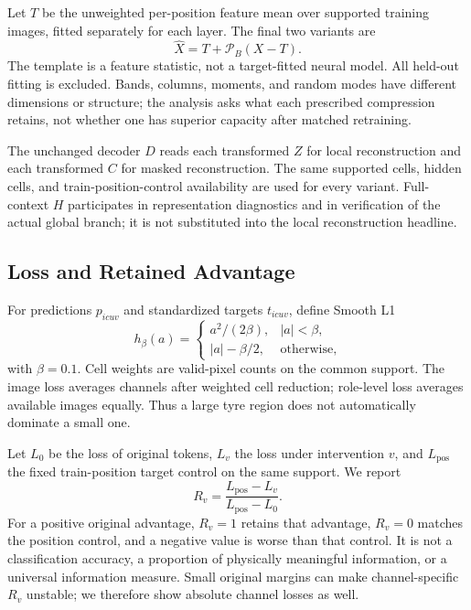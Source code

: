 Let $T$ be the unweighted per-position feature mean over supported training images, fitted separately for each layer. The final two variants are
\begin{equation}
 \widehat X=T+\mathcal{P}_B(X-T).
\end{equation}
The template is a feature statistic, not a target-fitted neural model. All held-out fitting is excluded. Bands, columns, moments, and random modes have different dimensions or structure; the analysis asks what each prescribed compression retains, not whether one has superior capacity after matched retraining.

The unchanged decoder $D$ reads each transformed $Z$ for local reconstruction and each transformed $C$ for masked reconstruction. The same supported cells, hidden cells, and train-position-control availability are used for every variant. Full-context $H$ participates in representation diagnostics and in verification of the actual global branch; it is not substituted into the local reconstruction headline.

\subsection{Loss and Retained Advantage}\label{sec:utility}
For predictions $p_{icuv}$ and standardized targets $t_{icuv}$, define Smooth L1
\begin{equation}
 h_\beta(a)=\begin{cases}a^2/(2\beta),&|a|<\beta,\\ |a|-\beta/2,&\text{otherwise},\end{cases}
\end{equation}
with $\beta=0.1$. Cell weights are valid-pixel counts on the common support. The image loss averages channels after weighted cell reduction; role-level loss averages available images equally. Thus a large tyre region does not automatically dominate a small one.

Let $L_0$ be the loss of original tokens, $L_v$ the loss under intervention $v$, and $L_{\mathrm{pos}}$ the fixed train-position target control on the same support. We report
\begin{equation}\label{eq:retention}
 R_v=\frac{L_{\mathrm{pos}}-L_v}{L_{\mathrm{pos}}-L_0}.
\end{equation}
For a positive original advantage, $R_v=1$ retains that advantage, $R_v=0$ matches the position control, and a negative value is worse than that control. It is not a classification accuracy, a proportion of physically meaningful information, or a universal information measure. Small original margins can make channel-specific $R_v$ unstable; we therefore show absolute channel losses as well.

